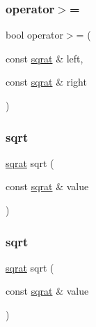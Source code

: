 \mbox{\label{classsqrat_adac0450048dc40c698aa22f334e280a1}} 
\subsubsection{\texorpdfstring{operator$>$=}{operator>=}\hspace{0.1cm}{\footnotesize\ttfamily [3/3]}}
{\footnotesize\ttfamily bool operator$>$= (\begin{DoxyParamCaption}\item[{const \mbox{\hyperlink{classsqrat}{sqrat}} \&}]{left,  }\item[{const \mbox{\hyperlink{classsqrat}{sqrat}} \&}]{right }\end{DoxyParamCaption})\hspace{0.3cm}{\ttfamily [friend]}}

\mbox{\label{classsqrat_aac93909598aa6f1b1b6bbe035a1af815}} 
\subsubsection{\texorpdfstring{sqrt}{sqrt}\hspace{0.1cm}{\footnotesize\ttfamily [1/3]}}
{\footnotesize\ttfamily \mbox{\hyperlink{classsqrat}{sqrat}} sqrt (\begin{DoxyParamCaption}\item[{const \mbox{\hyperlink{classsqrat}{sqrat}} \&}]{value }\end{DoxyParamCaption})\hspace{0.3cm}{\ttfamily [friend]}}

\mbox{\label{classsqrat_aac93909598aa6f1b1b6bbe035a1af815}} 
\subsubsection{\texorpdfstring{sqrt}{sqrt}\hspace{0.1cm}{\footnotesize\ttfamily [2/3]}}
{\footnotesize\ttfamily \mbox{\hyperlink{classsqrat}{sqrat}} sqrt (\begin{DoxyParamCaption}\item[{const \mbox{\hyperlink{classsqrat}{sqrat}} \&}]{value }\end{DoxyParamCaption})\hspace{0.3cm}{\ttfamily [friend]}}

